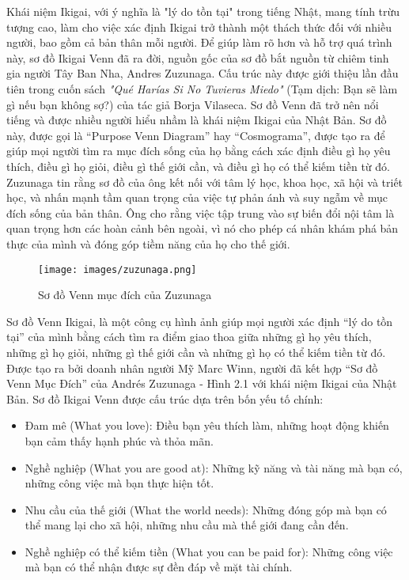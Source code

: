 Khái niệm Ikigai, với ý nghĩa là "lý do tồn tại" trong tiếng Nhật, mang tính trừu tượng cao, làm cho việc xác định Ikigai trở thành một thách thức đối với nhiều người, bao gồm cả bản thân mỗi người. Để giúp làm rõ hơn và hỗ trợ quá trình này, sơ đồ Ikigai Venn đã ra đời, nguồn gốc của sơ đồ bắt nguồn từ chiêm tinh gia người Tây Ban Nha, Andres Zuzunaga. Cấu trúc này được giới thiệu lần đầu tiên trong cuốn sách \textit{"Qué Harías Si No Tuvieras Miedo"} (Tạm dịch: Bạn sẽ làm gì nếu bạn không sợ?) của tác giả Borja Vilaseca. Sơ đồ Venn đã trở nên nổi tiếng và được nhiều người hiểu nhầm là khái niệm Ikigai của Nhật Bản. Sơ đồ này, được gọi là “Purpose Venn Diagram” hay “Cosmograma”, được tạo ra để giúp mọi người tìm ra mục đích sống của họ bằng cách xác định điều gì họ yêu thích, điều gì họ giỏi, điều gì thế giới cần, và điều gì họ có thể kiếm tiền từ đó. Zuzunaga tin rằng sơ đồ của ông kết nối với tâm lý học, khoa học, xã hội và triết học, và nhấn mạnh tầm quan trọng của việc tự phản ánh và suy ngẫm về mục đích sống của bản thân. Ông cho rằng việc tập trung vào sự biến đổi nội tâm là quan trọng hơn các hoàn cảnh bên ngoài, vì nó cho phép cá nhân khám phá bản thực của mình và đóng góp tiềm năng của họ cho thế giới.

\begin{figure}[H]
    \centering
    \texttt{[image: images/zuzunaga.png]}
    \vspace{0.6cm}
    \caption{Sơ đồ Venn mục đích của Zuzunaga}
\end{figure}

Sơ đồ Venn Ikigai, là một công cụ hình ảnh giúp mọi người xác định “lý do tồn tại” của mình bằng cách tìm ra điểm giao thoa giữa những gì họ yêu thích, những gì họ giỏi, những gì thế giới cần và những gì họ có thể kiếm tiền từ đó. Được tạo ra bởi doanh nhân người Mỹ Marc Winn, người đã kết hợp “Sơ đồ Venn Mục Đích” của Andrés Zuzunaga - Hình 2.1 với khái niệm Ikigai của Nhật Bản. Sơ đồ Ikigai Venn được cấu trúc dựa trên bốn yếu tố chính:

\begin{itemize}
    \item Đam mê (What you love): Điều bạn yêu thích làm, những hoạt động khiến bạn cảm thấy hạnh phúc và thỏa mãn.
    \item Nghề nghiệp (What you are good at): Những kỹ năng và tài năng mà bạn có, những công việc mà bạn thực hiện tốt.
    \item Nhu cầu của thế giới (What the world needs): Những đóng góp mà bạn có thể mang lại cho xã hội, những nhu cầu mà thế giới đang cần đến.
    \item Nghề nghiệp có thể kiếm tiền (What you can be paid for): Những công việc mà bạn có thể nhận được sự đền đáp về mặt tài chính. 
\end{itemize}

